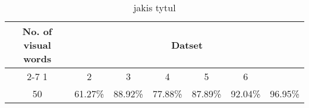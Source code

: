 \documentclass{article}
\begin{document}
\begin{table}
	\centering
		\begin{tabular}{|c|c|c|c|c|c|c|}
			\hline
			\multirow{2}{*}{No. of visual words} & \multicolumn{6}{c|}{Datset} \\ \cline{2-7} 
			  1 & 2 & 3 & 4 & 5 & 6 &  \\ \hline
			50 & 61.27\% & 88.92\% & 77.88\% & 87.89\% & 92.04\% & 96.95\% \\
			\hline
		\end{tabular}
	\caption{jakis tytul}
	\label{tab:dane}
\end{table}
\end{document}
